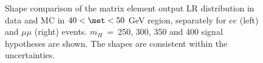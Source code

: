 \begin{figure}[!hbtp]
\caption{Shape comparison of the matrix element output LR distribution in data and MC in $40<\met<50$ GeV region, separately for $ee$ (left) and $\mu\mu$ (right) events. $m_H$~=~250, 300, 350 and 400 \GeVcc signal hypotheses are shown. The shapes are consistent within the uncertainties.}
\label{fig:LRshapeMETDataMC}                                                                                          
\end{figure}
